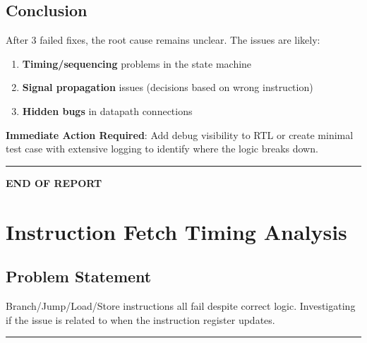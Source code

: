 \subsection{Conclusion}\label{cr:fix:rtl-debug-report:conclusion}

\begin{record}

After 3 failed fixes, the root cause remains unclear. The issues are
likely:

\begin{enumerate}
\def\labelenumi{\arabic{enumi}.}
\tightlist
\item
  \textbf{Timing/\allowbreak{}sequencing} problems in the state machine
\item
  \textbf{Signal propagation} issues (decisions based on wrong
  instruction)
\item
  \textbf{Hidden bugs} in datapath connections
\end{enumerate}

\textbf{Immediate Action Required}: Add debug visibility to RTL or
create minimal test case with extensive logging to identify where the
logic breaks down.

\begin{center}\rule{0.5\linewidth}{0.5pt}\end{center}

\textbf{END OF REPORT}

\end{record}

\section{Instruction Fetch Timing Analysis}\label{cr:fix:timing-analysis}

\subsection{Problem Statement}\label{cr:fix:timing-analysis:problem-statement}

\begin{record}

Branch/\allowbreak{}Jump/\allowbreak{}Load/\allowbreak{}Store
instructions all fail despite correct logic. Investigating if the issue
is related to when the instruction register updates.

\begin{center}\rule{0.5\linewidth}{0.5pt}\end{center}

\end{record}

